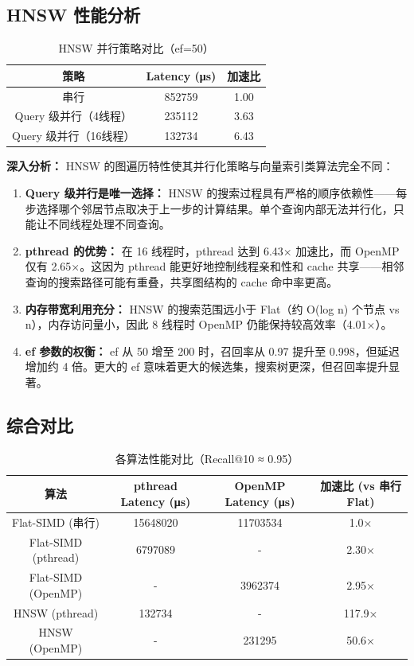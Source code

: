 \documentclass[a4paper]{article}
\begin{document}
\subsection{HNSW 性能分析}

\begin{table}[htbp]
\centering
\caption{HNSW 并行策略对比（ef=50）}
\begin{tabular}{ccc}
\toprule
策略 & Latency (μs) & 加速比 \\
\midrule
串行 & 852759 & 1.00 \\
Query 级并行（4线程） & 235112 & 3.63 \\
Query 级并行（16线程） & 132734 & 6.43 \\
\bottomrule
\end{tabular}
\end{table}

\textbf{深入分析：} HNSW 的图遍历特性使其并行化策略与向量索引类算法完全不同：

\begin{enumerate}
\item \textbf{Query 级并行是唯一选择：} HNSW 的搜索过程具有严格的顺序依赖性——每步选择哪个邻居节点取决于上一步的计算结果。单个查询内部无法并行化，只能让不同线程处理不同查询。
\item \textbf{pthread 的优势：} 在 16 线程时，pthread 达到 6.43× 加速比，而 OpenMP 仅有 2.65×。这因为 pthread 能更好地控制线程亲和性和 cache 共享——相邻查询的搜索路径可能有重叠，共享图结构的 cache 命中率更高。
\item \textbf{内存带宽利用充分：} HNSW 的搜索范围远小于 Flat（约 O(log n) 个节点 vs n），内存访问量小，因此 8 线程时 OpenMP 仍能保持较高效率（4.01×）。
\item \textbf{ef 参数的权衡：} ef 从 50 增至 200 时，召回率从 0.97 提升至 0.998，但延迟增加约 4 倍。更大的 ef 意味着更大的候选集，搜索树更深，但召回率提升显著。
\end{enumerate}

\subsection{综合对比}

\begin{table}[htbp]
\centering
\caption{各算法性能对比（Recall@10 ≈ 0.95）}
\begin{tabular}{cccc}
\toprule
算法 & pthread Latency (μs) & OpenMP Latency (μs) & 加速比 (vs 串行 Flat) \\
\midrule
Flat-SIMD (串行) & 15648020 & 11703534 & 1.0× \\
Flat-SIMD (pthread) & 6797089 & - & 2.30× \\
Flat-SIMD (OpenMP) & - & 3962374 & 2.95× \\
HNSW (pthread) & 132734 & - & 117.9× \\
HNSW (OpenMP) & - & 231295 & 50.6× \\
\bottomrule
\end{tabular}
\end{table}
\end{document}
